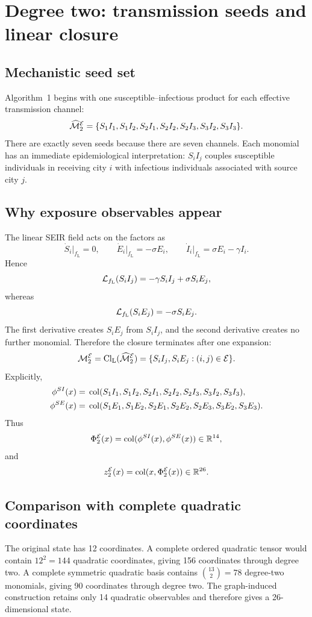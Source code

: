 \section{Degree two: transmission seeds and linear closure}
\label{sec:degree_two}

\subsection{Mechanistic seed set}

Algorithm~1 begins with one susceptible--infectious product for each effective
transmission channel:
\[
\widehat{\mathcal M}_2^{\mathcal{E}}
=
\{
S_1I_1,S_1I_2,
S_2I_1,S_2I_2,S_2I_3,
S_3I_2,S_3I_3
\}.
\]
There are exactly seven seeds because there are seven channels. Each monomial
has an immediate epidemiological interpretation: $S_iI_j$ couples susceptible
individuals in receiving city $i$ with infectious individuals associated with
source city $j$.

\subsection{Why exposure observables appear}

The linear SEIR field acts on the factors as
\[
\dot S_i\big|_{f_{\mathrm L}}=0,
\qquad
\dot E_i\big|_{f_{\mathrm L}}=-\sigma E_i,
\qquad
\dot I_i\big|_{f_{\mathrm L}}=\sigma E_i-\gamma I_i.
\]
Hence
\[
\mathcal{L}_{f_{\mathrm L}}(S_iI_j)
=
-\gamma S_iI_j+\sigma S_iE_j,
\]
whereas
\[
\mathcal{L}_{f_{\mathrm L}}(S_iE_j)=-\sigma S_iE_j.
\]
The first derivative creates $S_iE_j$ from $S_iI_j$, and the second derivative
creates no further monomial. Therefore the closure terminates after one
expansion:
\[
\mathcal M_2^{\mathcal{E}}
=
\operatorname{Cl}_{\mathrm L}(\widehat{\mathcal M}_2^{\mathcal{E}})
=
\{S_iI_j,S_iE_j:(i,j)\in\mathcal{E}\}.
\]
Explicitly,
\[
\begin{aligned}
\phi^{SI}(x)
={}&\operatorname{col}(
S_1I_1,S_1I_2,
S_2I_1,S_2I_2,S_2I_3,
S_3I_2,S_3I_3),\\
\phi^{SE}(x)
={}&\operatorname{col}(
S_1E_1,S_1E_2,
S_2E_1,S_2E_2,S_2E_3,
S_3E_2,S_3E_3).
\end{aligned}
\]
Thus
\[
\Phi_2^{\mathcal{E}}(x)=\operatorname{col}(\phi^{SI}(x),\phi^{SE}(x))\in\mathbb{R}^{14},
\]
and
\[
z_2^{\mathcal{E}}(x)=\operatorname{col}(x,\Phi_2^{\mathcal{E}}(x))\in\mathbb{R}^{26}.
\]


\subsection{Comparison with complete quadratic coordinates}

The original state has 12 coordinates. A complete ordered quadratic tensor
would contain $12^2=144$ quadratic coordinates, giving 156 coordinates through
degree two. A complete symmetric quadratic basis contains
$\binom{13}{2}=78$ degree-two monomials, giving 90 coordinates through degree
two. The graph-induced construction retains only 14 quadratic observables and
therefore gives a 26-dimensional state.
